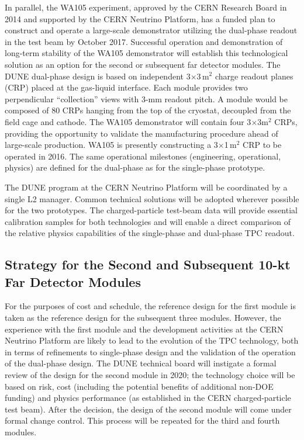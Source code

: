 In parallel, the WA105 experiment, approved by the CERN Research Board in 2014 and supported 
by the CERN Neutrino Platform, has a funded plan to construct and operate a large-scale 
demonstrator utilizing the dual-phase readout in the test beam by October 2017. 
Successful operation and demonstration of long-term stability of the WA105 demonstrator 
will establish this technological solution as an option for the second or subsequent 
far detector modules. The DUNE dual-phase design is based on independent 3$\times$3\,m$^2$
charge readout planes (CRP) placed at the gas-liquid interface. Each module provides 
two perpendicular ``collection'' views with 3-mm readout pitch. A  module 
would be composed of 80 CRPs hanging from the top of the cryostat, decoupled from 
the field cage and cathode. The WA105 demonstrator will contain four 3$\times$3m$^2$ 
CRPs, %
providing the opportunity to validate the manufacturing procedure 
ahead of large-scale production. WA105 is presently constructing a 3$\times$1\,m$^2$ 
CRP to be operated in 2016. The same operational milestones (engineering, operational, 
physics) are defined for the dual-phase as for the single-phase prototype.

The DUNE program at the CERN Neutrino Platform will be coordinated by a single 
L2 manager. Common technical solutions will be adopted wherever possible for the 
two prototypes. %
The charged-particle test-beam data will provide essential calibration samples 
for both technologies and will enable a direct comparison of the relative physics 
capabilities of the single-phase and dual-phase TPC readout. 

\subsection{Strategy for the Second and Subsequent 10-kt Far Detector Modules}
\label{v1ch3:subsqt-fd-mod-strategy}

For the purposes of cost and schedule, the reference design for the first module 
is taken as the reference design for the subsequent three modules. However, 
the experience with the first  module and the development activities at 
the CERN Neutrino Platform are likely to lead to the evolution of the TPC technology, both 
in terms of refinements to single-phase design and the validation of the operation 
of the dual-phase design. The DUNE technical board will instigate a formal review 
of the design for the second module in 2020; the technology choice 
will be based on risk, cost (including the potential benefits of additional 
non-DOE funding) and physics performance (as established in the CERN charged-particle 
test beam). After the decision, the design of the second module will come under formal 
change control. This process will be repeated for the third and fourth modules. 

